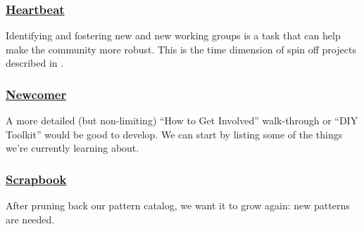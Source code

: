 \subsubsection*{\hyperref[sec:Heartbeat]{Heartbeat}} Identifying and fostering new  and new working groups is a task that can help make the community more robust.  This is the time dimension of spin off projects described in .

\subsubsection*{\hyperref[sec:Newcomer]{Newcomer}} A more detailed (but non-limiting) ``How to Get Involved'' walk-through or ``DIY Toolkit'' would be good to develop. We can start by listing some of the things we're currently learning about.

\subsubsection*{\hyperref[sec:Scrapbook]{Scrapbook}} 
After pruning back our pattern catalog, we want it to grow again: new patterns are needed.



